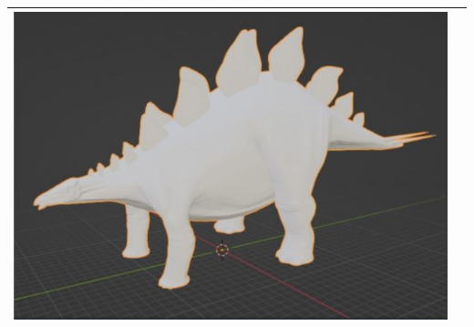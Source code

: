 \documentclass[12pt]{article} %
\begin{document}
\begin{center}
\begin{tabular}{ | m{19em} | m{19em} | }
		 	\includegraphics[scale=0.5]{images/Estegosaurio.JPG} \\  
			\hline
		\end{tabular}
	\end{center}
\end{document}
